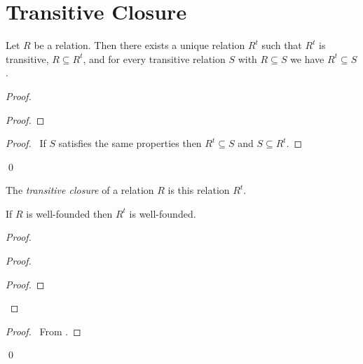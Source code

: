 \section{Transitive Closure}

\begin{theorem}
    Let $R$ be a relation. Then there exists a unique relation
    $R^t$ such that $R^t$ is transitive, $R \subseteq R^t$,
    and for every transitive relation $S$ with $R \subseteq S$
    we have $R^t \subseteq S$.
\end{theorem}

\begin{proof}
    \pf
    \begin{proof}
    \end{proof}
    \begin{proof}
        \pf\ If $S$ satisfies the same properties then $R^t \subseteq S$
        and $S \subseteq R^t$.
    \end{proof}
    \qed
\end{proof}

\begin{definition}
    The \emph{transitive closure} of a relation $R$ is this relation $R^t$.
\end{definition}

\begin{theorem}
    If $R$ is well-founded then $R^t$ is well-founded.
\end{theorem}

\begin{proof}
    \pf
    \begin{proof}
        \begin{proof}
        \end{proof}
    \end{proof}
    \begin{proof}
        \pf\ From .
    \end{proof}
    \qed
\end{proof}

